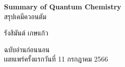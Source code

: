 

{
\thispagestyle{empty}

\begin{center}
    \vspace*{1.0in}
    
    \begin{spacing}{3}
    {\Huge \textbf{ Summary of Quantum Chemistry }}\\
    {\LARGE สรุปเคมีควอนตัม}
    \end{spacing}
    
    \vspace{1.0in}
    
    {\LARGE  รังสิมันต์ เกษแก้ว}
    
    \vspace{1.5in}
    
    {\LARGE ฉบับอ่านก่อนนอน \\
    \vspace{2em}
    เผยแพร่ครั้งแรกวันที่ 11 กรกฎาคม 2566
    }
    \vspace{0.5in}
    
    \vfill
\end{center}
}
